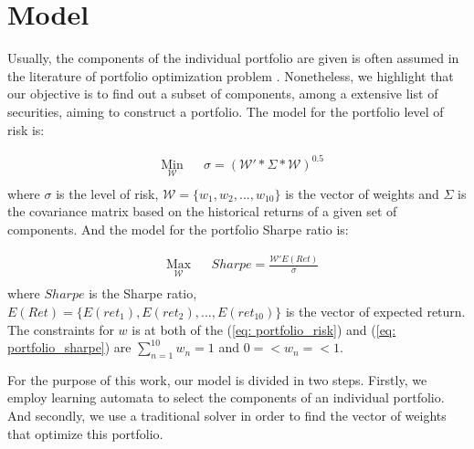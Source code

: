 \section{Model} \label{model}

Usually, the components of the individual portfolio are given is often assumed in the literature of portfolio optimization problem \cite{Brandt2007}. Nonetheless, we highlight that our objective is to find out a subset of components, among a extensive list of securities, aiming to construct a portfolio. The model for the portfolio level of risk is:

\begin{equation}
\begin{aligned}
& \underset{\mathcal{W}}{\text{Min}}
& & \sigma = (\mathcal{W}' * \Sigma * \mathcal{W})^{0.5} \\
\end{aligned}
\label{eq: portfolio_risk}
\end{equation}
where $\sigma$ is the level of risk, $\mathcal{W} = \{w_1, w_2, ..., w_{10}\}$ is the vector of weights and $\Sigma$ is the covariance matrix based on the historical returns of a given set of components. And the model for the portfolio Sharpe ratio is:

\begin{equation}
\begin{aligned}
& \underset{\mathcal{W}}{\text{Max}}
& & Sharpe= \frac{\mathcal{W}'E(Ret)}{\sigma} \\
\end{aligned}
\label{eq: portfolio_sharpe}
\end{equation}
where $Sharpe$ is the Sharpe ratio, $E(Ret) = \{E(ret_1), E(ret_2), ... , E(ret_{10})\}$ is the vector of expected return. The constraints for $w$ is at both of the (\ref{eq: portfolio_risk}) and (\ref{eq: portfolio_sharpe}) are $\sum_{n=1}^{10} w_n = 1$ and $0 =< w_n =<1$.

For the purpose of this work, our model is divided in two steps. Firstly, we employ learning automata to select the components of an individual portfolio. And secondly, we use a traditional solver in order to find the vector of weights that optimize this portfolio.

